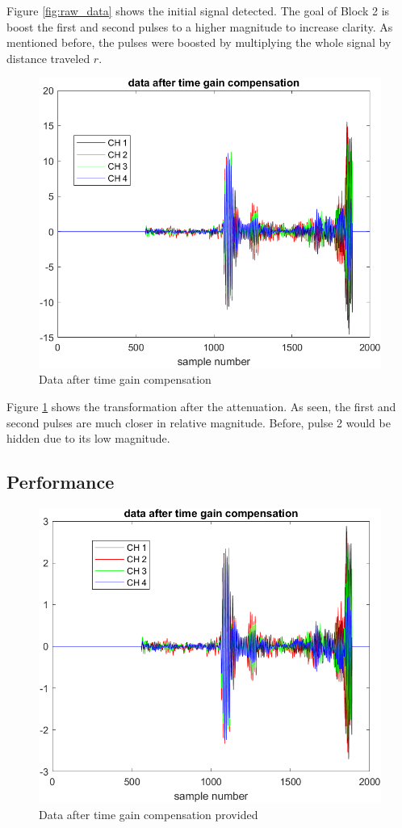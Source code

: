     Figure \ref{fig:raw_data} shows the initial signal detected. The goal of Block 2 is boost the first and second pulses to a higher magnitude to increase clarity. As mentioned before, the pulses were boosted by multiplying the whole signal by distance traveled $r$.

    \begin{figure}[H]
        \centering
        \includegraphics[width=0.5\linewidth]{figures/time_gain_1.png}
        \caption{Data after time gain compensation}
        \label{fig:time_gain1}
    \end{figure}

    
    Figure \ref{fig:time_gain1} shows the transformation after the attenuation. As seen, the first and second pulses are much closer in relative magnitude. Before, pulse 2 would be hidden due to its low magnitude. 

    \subsection{Performance}

    \begin{figure}[H]
        \centering
        \includegraphics[width=0.5\linewidth]{figures/TGC_before.png}
        \caption{Data after time gain compensation provided}
        \label{fig:time_gain2}
    \end{figure}

